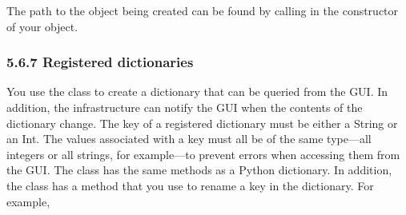 \documentclass[letterpaper,10pt,english]{sphinxmanual}
\begin{document}
\begin{sphinxVerbatim}[commandchars=\\\{\},numbers=left,firstnumber=1,stepnumber=1]
   
    
 
    

 
    
       

 
\PYG{p}{[}\PYG{p}{]}
\end{sphinxVerbatim}

The path to the object being created can be found by calling  in the constructor of your object.


\subsubsection{5.6.7 Registered dictionaries}
\label{\detokenize{abq_script_guide:registered-dictionaries}}
You use the  class to create a dictionary that can be queried from the GUI. In addition, the infrastructure can notify the GUI when the contents of the dictionary change. The key of a registered dictionary must be either a String or an Int. The values associated with a key must all be of the same type—all integers or all strings, for example—to prevent errors when accessing them from the GUI. The  class has the same methods as a Python dictionary. In addition, the  class has a  method that you use to rename a key in the dictionary. For example,
\end{document}
